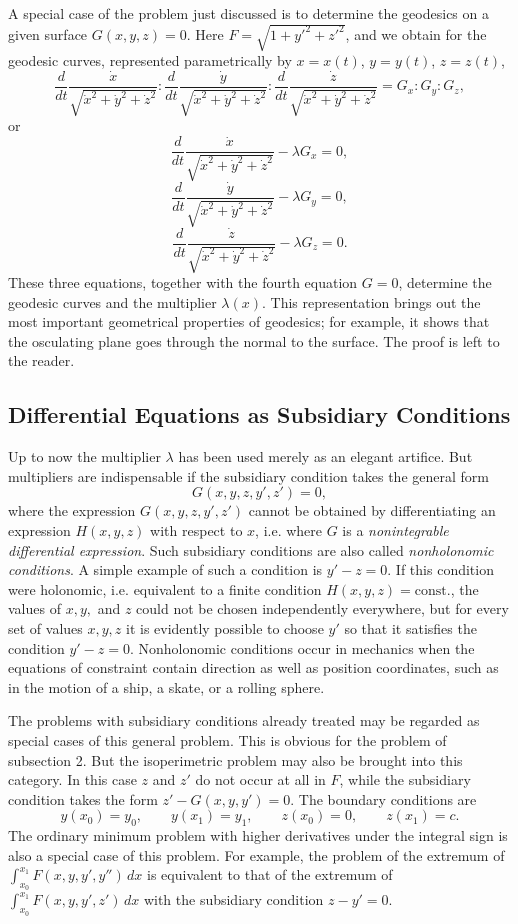 A special case of the problem just discussed is to determine the geodesics on a given surface $G(x,y,z)=0$. Here $F=\sqrt{1+y'^2+z'^2}$, and we obtain for the geodesic curves, represented parametrically by $x=x(t)$, $y=y(t)$, $z=z(t)$,
\[
\frac{d}{dt}\frac{\dot x}{\sqrt{\dot x^2+\dot y^2+\dot z^2}}:
\frac{d}{dt}\frac{\dot y}{\sqrt{\dot x^2+\dot y^2+\dot z^2}}:
\frac{d}{dt}\frac{\dot z}{\sqrt{\dot x^2+\dot y^2+\dot z^2}}
=G_x:G_y:G_z,
\]
or
\[
\frac{d}{dt}\frac{\dot x}{\sqrt{\dot x^2+\dot y^2+\dot z^2}}-\lambda G_x=0,
\]
\[
\frac{d}{dt}\frac{\dot y}{\sqrt{\dot x^2+\dot y^2+\dot z^2}}-\lambda G_y=0,
\]
\[
\frac{d}{dt}\frac{\dot z}{\sqrt{\dot x^2+\dot y^2+\dot z^2}}-\lambda G_z=0.
\]
These three equations, together with the fourth equation $G=0$, determine the geodesic curves and the multiplier $\lambda(x)$. This representation brings out the most important geometrical properties of geodesics; for example, it shows that the osculating plane goes through the normal to the surface. The proof is left to the reader.

\subsection{Differential Equations as Subsidiary Conditions}
Up to now the multiplier $\lambda$ has been used merely as an elegant artifice. But multipliers are indispensable if the subsidiary condition takes the general form
\begin{equation}\tag{56}
G(x,y,z,y',z')=0,
\end{equation}
where the expression $G(x,y,z,y',z')$ cannot be obtained by differentiating an expression $H(x,y,z)$ with respect to $x$, i.e. where $G$ is a \emph{nonintegrable differential expression}. Such subsidiary conditions are also called \emph{nonholonomic conditions}. A simple example of such a condition is $y'-z=0$. If this condition were holonomic, i.e. equivalent to a finite condition $H(x,y,z)=\text{const.}$, the values of $x,y,$ and $z$ could not be chosen independently everywhere, but for every set of values $x,y,z$ it is evidently possible to choose $y'$ so that it satisfies the condition $y'-z=0$. Nonholonomic conditions occur in mechanics when the equations of constraint contain direction as well as position coordinates, such as in the motion of a ship, a skate, or a rolling sphere.

The problems with subsidiary conditions already treated may be regarded as special cases of this general problem. This is obvious for the problem of subsection 2. But the isoperimetric problem may also be brought into this category. In this case $z$ and $z'$ do not occur at all in $F$, while the subsidiary condition takes the form $z'-G(x,y,y')=0$. The boundary conditions are
\[
y(x_0)=y_0,\qquad y(x_1)=y_1,\qquad z(x_0)=0,\qquad z(x_1)=c.
\]
The ordinary minimum problem with higher derivatives under the integral sign is also a special case of this problem. For example, the problem of the extremum of $\int_{x_0}^{x_1}F(x,y,y',y'')\,dx$ is equivalent to that of the extremum of $\int_{x_0}^{x_1}F(x,y,y',z')\,dx$ with the subsidiary condition $z-y'=0$.


